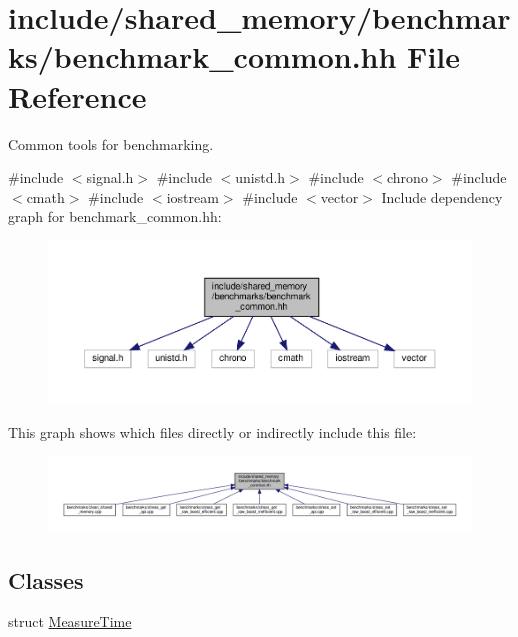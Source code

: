 \hypertarget{benchmark__common_8hh}{}\section{include/shared\+\_\+memory/benchmarks/benchmark\+\_\+common.hh File Reference}
\label{benchmark__common_8hh}


Common tools for benchmarking.  


{\ttfamily \#include $<$signal.\+h$>$}\newline
{\ttfamily \#include $<$unistd.\+h$>$}\newline
{\ttfamily \#include $<$chrono$>$}\newline
{\ttfamily \#include $<$cmath$>$}\newline
{\ttfamily \#include $<$iostream$>$}\newline
{\ttfamily \#include $<$vector$>$}\newline
Include dependency graph for benchmark\+\_\+common.\+hh\+:
\nopagebreak
\begin{figure}[H]
\begin{center}
\leavevmode
\includegraphics[width=350pt]{benchmark__common_8hh__incl}
\end{center}
\end{figure}
This graph shows which files directly or indirectly include this file\+:
\nopagebreak
\begin{figure}[H]
\begin{center}
\leavevmode
\includegraphics[width=350pt]{benchmark__common_8hh__dep__incl}
\end{center}
\end{figure}
\subsection*{Classes}
\begin{DoxyCompactItemize}
\item 
struct \hyperlink{structMeasureTime}{Measure\+Time}
\end{DoxyCompactItemize}
